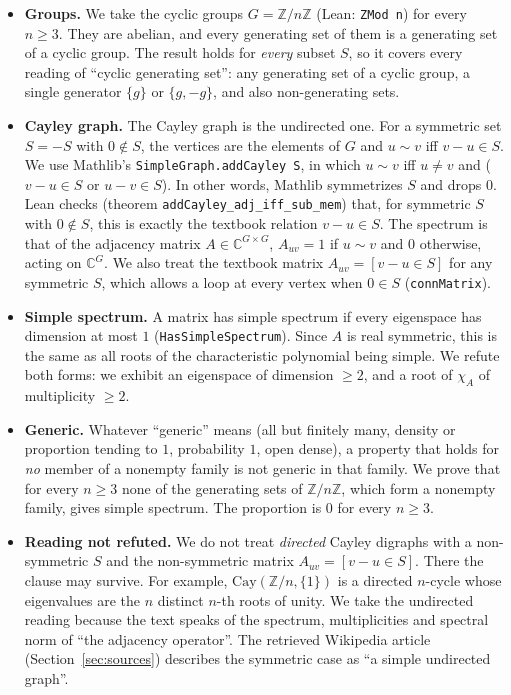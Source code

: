 \documentclass[11pt]{article}
\theoremstyle{definition}
\theoremstyle{remark}
\begin{document}
\begin{itemize}
\item \textbf{Groups.} We take the cyclic groups $G=\mathbb{Z}/n\mathbb{Z}$ (Lean: \texttt{ZMod n})
  for every $n\ge 3$. They are abelian, and every generating set of them is a generating set of a
  cyclic group. The result holds for \emph{every} subset $S$, so it covers every reading of
  ``cyclic generating set'': any generating set of a cyclic group, a single generator $\{g\}$ or
  $\{g,-g\}$, and also non-generating sets.
\item \textbf{Cayley graph.} The Cayley graph is the undirected one. For a symmetric set $S=-S$
  with $0\notin S$, the vertices are the elements of $G$ and $u\sim v$ iff $v-u\in S$. We use
  Mathlib's \texttt{SimpleGraph.addCayley S}, in which $u\sim v$ iff $u\ne v$ and ($v-u\in S$ or
  $u-v\in S$). In other words, Mathlib symmetrizes $S$ and drops $0$. Lean checks (theorem
  \texttt{addCayley\_adj\_iff\_sub\_mem}) that, for symmetric $S$ with $0\notin S$, this is exactly
  the textbook relation $v-u\in S$. The spectrum is that of the adjacency matrix
  $A\in\mathbb{C}^{G\times G}$, $A_{uv}=1$ if $u\sim v$ and $0$ otherwise, acting on
  $\mathbb{C}^G$. We also treat the textbook matrix $A_{uv}=[v-u\in S]$ for any symmetric $S$,
  which allows a loop at every vertex when $0\in S$ (\texttt{connMatrix}).
\item \textbf{Simple spectrum.} A matrix has simple spectrum if every eigenspace has dimension at
  most $1$ (\texttt{HasSimpleSpectrum}). Since $A$ is real symmetric, this is the same as all roots
  of the characteristic polynomial being simple. We refute both forms: we exhibit an eigenspace of
  dimension $\ge 2$, and a root of $\chi_A$ of multiplicity $\ge 2$.
\item \textbf{Generic.} Whatever ``generic'' means (all but finitely many, density or proportion
  tending to $1$, probability $1$, open dense), a property that holds for \emph{no} member of a
  nonempty family is not generic in that family. We prove that for every $n\ge 3$ none of the
  generating sets of $\mathbb{Z}/n\mathbb{Z}$, which form a nonempty family, gives simple
  spectrum. The proportion is $0$ for every $n\ge 3$.
\item \textbf{Reading not refuted.} We do not treat \emph{directed} Cayley digraphs with a
  non-symmetric $S$ and the non-symmetric matrix $A_{uv}=[v-u\in S]$. There the clause may
  survive. For example, $\mathrm{Cay}(\mathbb{Z}/n,\{1\})$ is a directed $n$-cycle whose
  eigenvalues are the $n$ distinct $n$-th roots of unity. We take the undirected reading because
  the text speaks of the spectrum, multiplicities and spectral norm of ``the adjacency
  operator''. The retrieved Wikipedia article (Section~\ref{sec:sources}) describes the symmetric
  case as ``a simple undirected graph''.
\end{itemize}
\end{document}
